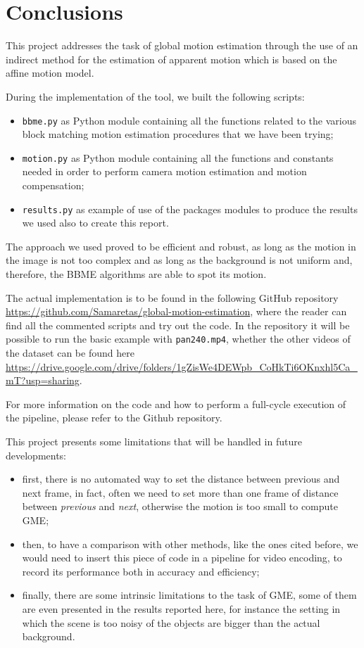 \section{Conclusions}
\label{sec:conclusions}

This project addresses the task of global motion estimation through the use of an indirect method for the estimation of apparent motion which is based on the affine motion model.

During the implementation of the tool, we built the following scripts:
\begin{itemize}
    \item \texttt{bbme.py} as Python module containing all the functions related to the various block matching motion estimation procedures that we have been trying;
    \item \texttt{motion.py} as Python module containing all the functions and constants needed in order to perform camera motion estimation and motion compensation;
    \item \texttt{results.py} as example of use of the packages modules to produce the results we used also to create this report.  
\end{itemize}

The approach we used proved to be efficient and robust, as long as the motion in the image is not too complex and as long as the background is not uniform and, therefore, the BBME algorithms are able to spot its motion.

The actual implementation is to be found in the following GitHub repository \url{https://github.com/Samaretas/global-motion-estimation}, where the reader can find all the commented scripts and try out the code.
In the repository it will be possible to run the basic example with \texttt{pan240.mp4}, whether the other videos of the dataset can be found here \url{https://drive.google.com/drive/folders/1gZisWe4DEWpb_CoHkTi6OKnxhl5Ca_mT?usp=sharing}.

For more information on the code and how to perform a full-cycle execution of the pipeline, please refer to the Github repository.

This project presents some limitations that will be handled in future developments:
\begin{itemize}
    \item first, there is no automated way to set the distance between previous and next frame, in fact, often we need to set more than one frame of distance between \textit{previous} and \textit{next}, otherwise the motion is too small to compute GME;
    \item then, to have a comparison with other methods, like the ones cited before, we would need to insert this piece of code in a pipeline for video encoding, to record its performance both in accuracy and efficiency;
    \item finally, there are some intrinsic limitations to the task of GME, some of them are even presented in the results reported here, for instance the setting in which the scene is too noisy of the objects are bigger than the actual background.
\end{itemize}